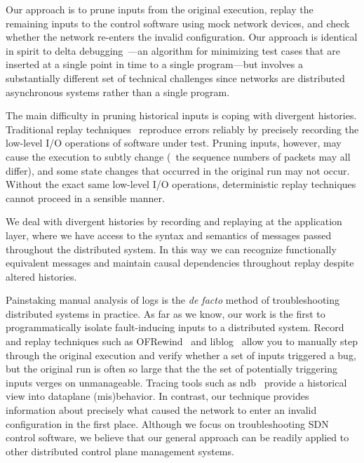 Our approach is to prune inputs from the original execution, replay the remaining
inputs to the control software using mock network devices, and
check whether the network re-enters the invalid configuration.
Our approach is identical in spirit to delta
debugging~\cite{Zeller:1999:YMP:318773.318946}---an algorithm for
minimizing test cases that are inserted at a single
point in time to a single program---but
involves a substantially different set of technical challenges since networks are
distributed asynchronous systems rather than a single program.

The main difficulty in pruning historical inputs is
coping with divergent histories. Traditional replay
techniques~\cite{Dunlap:2002:REI:844128.844148,Geels:2006:RDD:1267359.1267386}
reproduce errors reliably by precisely recording the low-level I/O operations of
software under test. Pruning inputs, however, may cause the execution to
subtly change (\eg~the sequence numbers of packets may all differ), and some
state changes that occurred in the original
run may not occur. Without the exact same low-level I/O operations,
deterministic replay techniques cannot proceed in a sensible manner.

We deal with divergent histories by recording and replaying at the application layer,
where we have access to the syntax and semantics of messages passed
throughout the distributed system. In this way we can recognize functionally
equivalent messages and maintain causal dependencies throughout replay despite
altered histories.

Painstaking manual analysis of logs is the
{\em de facto} method of troubleshooting distributed systems in practice.
As far as we know, our work
is the first to programmatically isolate fault-inducing inputs to a distributed
system. Record and replay techniques such as
OFRewind~\cite{ofrewind} and liblog~\cite{Geels:2006:RDD:1267359.1267386}
allow you to manually step through the original execution and verify whether a
set of inputs triggered a bug,
but the original run is often so large that the
the set of potentially triggering inputs verges on unmanageable.
Tracing tools such as ndb~\cite{handigol2012debugger} provide
a historical view into dataplane (mis)behavior. In contrast, our technique provides
information about precisely what caused the network to
enter an invalid configuration in the first place. Although we focus on
troubleshooting SDN control software, we believe that our general approach can
be readily applied to other distributed control plane management systems.


